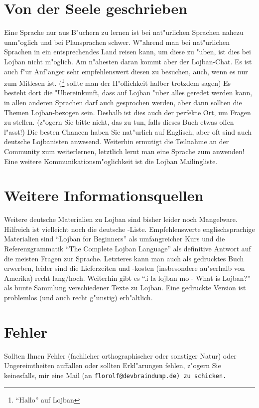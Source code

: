 \section{Von der Seele geschrieben}
Eine Sprache nur aus B"uchern zu lernen ist bei nat"urlichen Sprachen nahezu unm"oglich und bei Plansprachen schwer. W"ahrend
man bei nat"urlichen Sprachen in ein entsprechendes Land reisen kann, um diese zu "uben, ist dies bei Lojban nicht m"oglich.
Am n"ahesten daran kommt aber der Lojban-Chat. Es ist auch f"ur Anf"anger sehr empfehlenswert diesen zu besuchen, auch, wenn es nur zum Mitlesen ist. (\footnote{``Hallo'' auf Lojban} sollte man der H"oflichkeit halber trotzdem sagen)
Es besteht dort die "Ubereinkunft, dass auf Lojban "uber alles geredet werden kann, in allen anderen Sprachen darf auch gesprochen werden,
aber dann sollten die Themen Lojban-bezogen sein. Deshalb ist dies auch der perfekte Ort, um Fragen zu stellen. (z"ogern Sie bitte nicht, das zu tun, falls dieses Buch etwas offen l"asst!)
Die besten Chancen haben Sie nat"urlich auf Englisch, aber oft sind auch deutsche Lojbanisten anwesend.
Weiterhin ermutigt die Teilnahme an der Community zum weiterlernen, letztlich lernt man eine Sprache zum anwenden!
Eine weitere Kommunikationsm"oglichkeit ist die Lojban Mailingliste.

\section{Weitere Informationsquellen}
Weitere deutsche Materialien zu Lojban sind bisher leider noch Mangelware. Hilfreich ist vielleicht noch die deutsche -Liste.
Empfehlenswerte englischsprachige Materialien sind ``Lojban for Beginners'' als umfangreicher Kurs und die Referenzgrammatik ``The Complete Lojban Language'' als definitive Antwort
auf die meisten Fragen zur Sprache. Letzteres kann man auch als gedrucktes Buch erwerben, leider sind die Lieferzeiten und -kosten (insbesondere au"serhalb von Amerika) recht lang/hoch.
Weiterhin gibt es ``.i la lojban mo - What is Lojban?'' als bunte Sammlung verschiedener Texte zu Lojban. Eine gedruckte Version ist problemlos (und auch recht g"unstig) erh"altlich.

\section{Fehler}
Sollten Ihnen Fehler (fachlicher orthographischer oder sonstiger Natur) oder Ungereimtheiten auffallen oder sollten
Erkl"arungen fehlen, z"ogern Sie keinesfalls, mir eine Mail (an \tt{florolf@devbraindump.de}\rm{}) zu schicken.
